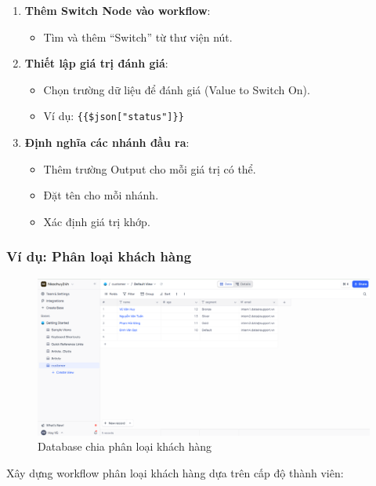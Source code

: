 \begin{enumerate}
  \item \textbf{Thêm Switch Node vào workflow}:
  \begin{itemize}
    \item Tìm và thêm ``Switch'' từ thư viện nút.
  \end{itemize}

  \item \textbf{Thiết lập giá trị đánh giá}:
  \begin{itemize}
    \item Chọn trường dữ liệu để đánh giá (Value to Switch On).
    \item Ví dụ: \texttt{\{\{\$json["status"]\}\}}
  \end{itemize}

  \item \textbf{Định nghĩa các nhánh đầu ra}:
  \begin{itemize}
    \item Thêm trường Output cho mỗi giá trị có thể.
    \item Đặt tên cho mỗi nhánh.
    \item Xác định giá trị khớp.
  \end{itemize}
\end{enumerate}

\newpage
\subsubsection{Ví dụ: Phân loại khách hàng}

\begin{figure}[htbp]
    \centering
    \includegraphics[width=1\linewidth]{Chap1-7/segment_db.pdf}
    \caption{Database chia phân loại khách hàng}
\end{figure}

Xây dựng workflow phân loại khách hàng dựa trên cấp độ thành viên:

